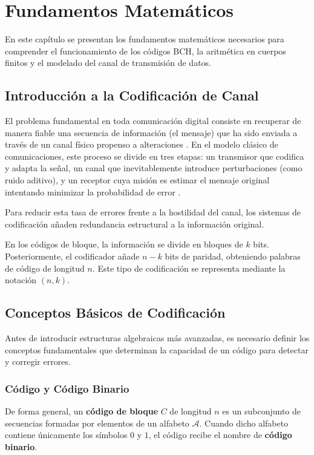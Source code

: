 \chapter{Fundamentos Matemáticos}
\label{cap:fundamentos}

En este capítulo se presentan los fundamentos matemáticos necesarios para comprender el funcionamiento de los códigos BCH, la aritmética en cuerpos finitos y el modelado del canal de transmisión de datos.

\section{Introducción a la Codificación de Canal}

El problema fundamental en toda comunicación digital consiste en recuperar de manera fiable una secuencia de información (el mensaje) que ha sido enviada a través de un canal físico propenso a alteraciones \cite{artes2012comunicaciones}. En el modelo clásico de comunicaciones, este proceso se divide en tres etapas: un transmisor que codifica y adapta la señal, un canal que inevitablemente introduce perturbaciones (como ruido aditivo), y un receptor cuya misión es estimar el mensaje original intentando minimizar la probabilidad de error \cite{artes2012comunicaciones}.

Para reducir esta tasa de errores frente a la hostilidad del canal, los sistemas de codificación añaden redundancia estructural a la información original.

En los códigos de bloque, la información se divide en bloques de $k$ bits. Posteriormente, el codificador añade $n-k$ bits de paridad, obteniendo palabras de código de longitud $n$. Este tipo de codificación se representa mediante la notación $(n,k)$.


\section{Conceptos Básicos de Codificación}
\label{sec:conceptos_basicos}

Antes de introducir estructuras algebraicas más avanzadas, es necesario definir los conceptos fundamentales que determinan la capacidad de un código para detectar y corregir errores.

\subsection{Código y Código Binario}

De forma general, un \textbf{código de bloque} $C$ de longitud $n$ es un subconjunto de secuencias formadas por elementos de un alfabeto $\mathcal{A}$. Cuando dicho alfabeto contiene únicamente los símbolos $0$ y $1$, el código recibe el nombre de \textbf{código binario}.

